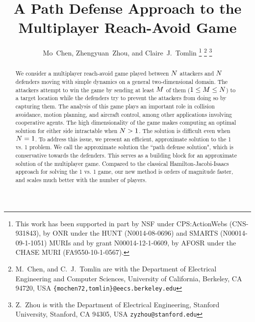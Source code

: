 \documentclass[letterpaper, 10 pt, conference]{ieeeconf}  %
\title{\LARGE \bf
A Path Defense Approach to the Multiplayer Reach-Avoid Game
}
\author{Mo~Chen, Zhengyuan~Zhou, and Claire~J.~Tomlin%
\thanks{This work has been supported in part by NSF under CPS:ActionWebs (CNS-931843), by ONR under the HUNT (N0014-08-0696) and SMARTS (N00014-09-1-1051) MURIs and by grant N00014-12-1-0609, by AFOSR under the CHASE MURI (FA9550-10-1-0567).}%
\thanks{M.~Chen, and C.~J.~Tomlin are with the Department of Electrical Engineering and Computer Sciences,
        University of California, Berkeley, CA 94720, USA
        {\tt\small \{mochen72,tomlin\}@eecs.berkeley.edu}}
\thanks{Z.~Zhou is with the Department of Electrical Engineering,
        Stanford University, Stanford, CA 94305, USA
        {\tt\small zyzhou@stanford.edu}}   
}
\numberwithin{algorithm}{section}
\begin{document}
\maketitle

\thispagestyle{empty}
\pagestyle{empty}

\begin{abstract}
We consider a multiplayer reach-avoid game played between $N$ attackers and $N$ defenders moving with simple dynamics on a general two-dimensional domain. The attackers attempt to win the game by sending at least $M$ of them ($1\le M\le N$) to a target location while the defenders try to prevent the attackers from doing so by capturing them. The analysis of this game plays an important role in collision avoidance, motion planning, and aircraft control, among other applications involving cooperative agents. The high dimensionality of the game makes computing an optimal solution for either side intractable when $N>1$. The solution is difficult even when $N=1$. To address this issue, we present an efficient, approximate solution to the 1 vs. 1 problem. We call the approximate solution the ``path defense solution", which is conservative towards the defenders. This serves as a building block for an approximate solution of the multiplayer game. Compared to the classical Hamilton-Jacobi-Isaacs approach for solving the 1 vs. 1 game, our new method is orders of magnitude faster, and scales much better with the number of players.
\end{abstract}







%





\end{document}
